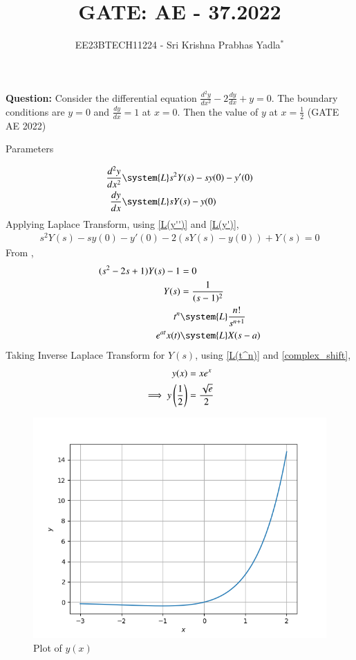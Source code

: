 \documentclass[journal,12pt,twocolumn]{IEEEtran}
\theoremstyle{remark}
\begin{document}

\vspace{3cm}

\title{GATE: AE - 37.2022}
\author{EE23BTECH11224 - Sri Krishna Prabhas Yadla$^{*}$%
}
\maketitle
\newpage
\bigskip

\renewcommand{\thefigure}{\arabic{figure}}
\renewcommand{\thetable}{\arabic{table}}


\vspace{3cm}
\textbf{Question:} Consider the differential equation $\frac{d^2y}{dx^2}-2\frac{dy}{dx}+y=0$. The boundary conditions are $y=0$ and $\frac{dy}{dx}=1$ at $x=0$. Then the value of $y$ at $x=\frac{1}{2}$ \hfill (GATE AE 2022)\\
\solution
\begin{table}[htbp]
	\centering
	\def\arraystretch{1.5}
	
	\caption{Parameters}
	\label{tab:parameters}
\end{table}
\begin{align}
\label{L(y'')}\frac{d^2y}{dx^2} &\system{L} s^2Y(s)-sy(0)-y'(0)\\
\label{L(y')}\frac{dy}{dx} &\system{L} sY(s)-y(0)
\end{align}
Applying Laplace Transform, using \eqref{L(y'')} and \eqref{L(y')},
\begin{align}
s^2Y(s)-sy(0)-y'(0) - 2(sY(s)-y(0)) + Y(s) = 0
\end{align}
From ,
\begin{align}
(s^2-2s+1)Y(s)-1 &= 0 \\
Y(s) &= \frac{1}{(s-1)^2}\\
\label{L(t^n)}t^n &\system{L} \frac{n!}{s^{n+1}}\\
	\label{complex_shift}e^{at} x(t) &\system{L} X(s-a)
\end{align}
Taking Inverse Laplace Transform for $Y(s)$, using \eqref{L(t^n)} and \eqref{complex_shift},
\begin{align}
y(x) &= xe^x \\
\implies y\left(\frac{1}{2}\right) &= \frac{\sqrt{e}}{2}
\end{align}
\begin{figure}[htbp]
	\includegraphics[width=\columnwidth]{figs/plot.png}
	\caption{Plot of $y(x)$}
	\label{fig:plot}
\end{figure}
\end{document}
